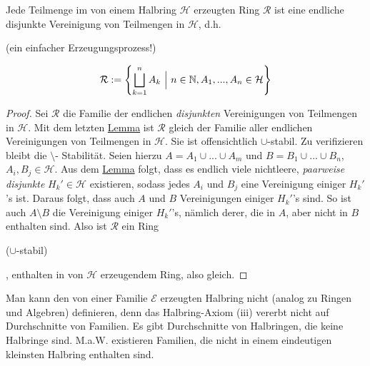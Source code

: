 \begin{proposition}
\begin{mdframed}
Jede Teilmenge im von einem Halbring $\mathcal{H}$ erzeugten Ring $\mathcal{R}$ ist eine endliche disjunkte Vereinigung von Teilmengen in $\mathcal{H}$, d.h. \begin{scriptsize}(ein einfacher Erzeugungsprozess!)\end{scriptsize}
\begin{equation}
\mathcal{R} := \left\{ \bigsqcup_{k=1}^n A_k \  \Big\rvert \ n\in \mathbb{N}, A_1,...,A_n \in \mathcal{H} \right\}
\label{eqI14}
\end{equation}
\end{mdframed}
\begin{proof}
Sei $\mathcal{R}$ die Familie der endlichen \emph{disjunkten} Vereinigungen von Teilmengen in $\mathcal{H}$. Mit dem letzten \hyperref[lemmaA]{Lemma} ist $\mathcal{R}$ gleich der Familie aller endlichen Vereinigungen von Teilmengen in $\mathcal{H}$. Sie ist offensichtlich $\cup$-stabil. Zu verifizieren bleibt die $\setminus$- Stabilität. Seien hierzu $A = A_1 \cup ... \cup A_m$ und $B = B_1 \cup ... \cup B_n$, $A_i, B_j \in \mathcal{H}$. Aus dem \hyperref[lemmaA]{Lemma}  folgt, dass es endlich viele nichtleere, \emph{paarweise disjunkte} $H_k' \in \mathcal{H}$ existieren, sodass jedes $A_i$ und $B_j$ eine Vereinigung einiger $H_k'$'s ist. Daraus folgt, dass auch $A$ und $B$ Vereinigungen einiger $H_k'$'s sind. So ist auch $A\setminus B$ die Vereinigung einiger $H_k'$'s, nämlich derer, die in $A$, aber nicht in $B$ enthalten sind. Also ist $\mathcal{R}$ ein Ring \begin{scriptsize}($\cup$-stabil)\end{scriptsize}, enthalten in von $\mathcal{H}$ erzeugendem Ring, also gleich.
\end{proof}
\end{proposition}

\begin{remark}
Man kann den von einer Familie $\mathcal{E}$ erzeugten Halbring nicht (analog zu Ringen und Algebren) definieren, denn das Halbring-Axiom (iii) vererbt nicht auf Durchschnitte von Familien. Es gibt Durchschnitte von Halbringen, die keine Halbringe sind. M.a.W. existieren Familien, die nicht in einem eindeutigen kleinsten Halbring enthalten sind.
\end{remark}

